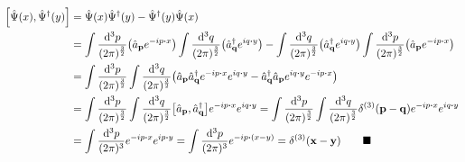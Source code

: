 \documentclass{article}
\begin{document}
\begin{align*}
    \bqty{\hat{\Psi}(x),\hat{\Psi}^\dagger (y)} & =\hat{\Psi}(x)\hat{\Psi}^\dagger(y) - \hat{\Psi}^\dagger(y)\hat{\Psi}(x)                                                                                                                                                                                                                                                                               \\
                                                & =\int \frac{\dd[3]{p}}{(2\pi)^\frac{3}{2}}    \pqty{\hat{a}_{\vb{p}}e^{-ip\vdot x}}\int \frac{\dd[3]{q}}{(2\pi)^\frac{3}{2}}  \pqty{\hat{a}^\dagger_{\vb{q}}e^{iq\vdot y}}  -\int \frac{\dd[3]{q}}{(2\pi)^\frac{3}{2}}  \pqty{\hat{a}^\dagger_{\vb{q}}e^{iq\vdot y}}\int \frac{\dd[3]{p}}{(2\pi)^\frac{3}{2}}    \pqty{\hat{a}_{\vb{p}}e^{-ip\vdot x}} \\
                                                & =\int \frac{\dd[3]{p}}{(2\pi)^\frac{3}{2}}\int \frac{\dd[3]{q}}{(2\pi)^\frac{3}{2}}    \pqty{\hat{a}_{\vb{p}}\hat{a}^\dagger_{\vb{q}}e^{-ip\vdot x} e^{iq\vdot y}  -  \hat{a}^\dagger_{\vb{q}}\hat{a}_{\vb{p}}e^{iq\vdot y}e^{-ip\vdot x}}                                                                                                             \\
                                                & =\int \frac{\dd[3]{p}}{(2\pi)^\frac{3}{2}}\int \frac{\dd[3]{q}}{(2\pi)^\frac{3}{2}}    \bqty{\hat{a}_{\vb{p}},\hat{a}^\dagger_{\vb{q}}}e^{-ip\vdot x} e^{iq\vdot y}=\int \frac{\dd[3]{p}}{(2\pi)^\frac{3}{2}}\int \frac{\dd[3]{q}}{(2\pi)^\frac{3}{2}}    \delta^{(3)}(\vb{p}-\vb{q})e^{-ip\vdot x}  e^{iq\vdot y}                                     \\
                                                & =\int \frac{\dd[3]{p}}{(2\pi)^3}e^{-ip\vdot x}  e^{ip\vdot y}=\int \frac{\dd[3]{p}}{(2\pi)^3}e^{-ip\vdot (x-y)}=\delta^{(3)}(\vb{x}-\vb{y})\qquad\blacksquare                                                                                                                                                                                          \\
\end{align*}
\end{document}
